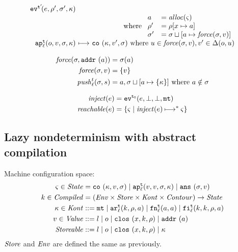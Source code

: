 \documentclass{llncs}
\newcommand{\alt}{\mid}
\begin{document}
\begin{gather*}
\begin{array}{@{}r@{\ }c@{\ }l@{}}
\ev[^{\mcntr'}\!]{\mexp,\menv',\msto',\mkont}
\\
\multicolumn{3}{r@{}}{
\text{ where }
\begin{array}{ll}
 \maddr &= \alloc(\mstate) \\
 \menv' &= \menv[\mvar \mapsto \maddr] \\
 \msto' &= \msto\sqcup[\maddr \mapsto \spchoice{\force(\msto, \mval)}{\force(\mval)}]
\end{array}}
\\
\ap[^\mcntr_\mlab]{\mop,\mval,\msto,\mkont} & \machstep&
\co{\mkont,\mval',\msto}
\text{ where } \mvalx{u} \in \spchoice{\force(\msto, \mval)}{\force(\mval)}, \mval'\in\interpdelta(\mop,\mvalx{u})
\end{array}
\end{gather*}

\begin{align*}
\spchoice
{\force(\msto,\saddr\maddr) &= \msto(\maddr) \\
 \force(\msto,\mval) &= \{ \mval \}}
{\force(\superposition{\mval{s}}) &= \mval{s} \\
 \force(\mval) &= \{ \mval \}}
\\
\push_\mlab^\mcntr(\msto,\mstor) &= \maddr,\msto\sqcup[\maddr\mapsto\{\mkont\}]
\mbox{ where }\maddr \notin\msto
\end{align*}

\begin{align*}
\inject(\mexp) &= \ev[^\mtcntr]{\mexp,\bot,\bot,\kmt} \\
\reachable{\mexp} &= \setof{\mstate \mid \inject(\mexp) \machstep^* \mstate}
\end{align*}

\subsection{Lazy nondeterminism with abstract compilation}

Machine configuration space:
\begin{align*}
\mstate \in \State &= \co{\mkont, \mval, \msto} \alt
                     \ap[_\mlab^\mcntr]{\mval,\mval,\msto,\mkont} \alt
                     \ans{\msto, \mval}\\
\mcomp \in \Compiled &= (\Env \times \Store \times \Kont \times \Counter) \to \State \\
\mkont \in \Kont &::= \kmt \alt
                      \kar[_\mlab^\mcntr]{\mcomp, \menv, \maddr} \alt
                      \kfn[_\mlab^\mcntr]{\maddr, \maddr} \alt
                      \kif[_\mlab^\mcntr]{\mcomp, \mcomp, \menv, \maddr} \\
\mval \in \Value &::= \mlit \alt \mop \alt
                      \clos{\mvar,\mcomp,\menv} \alt
                      \spchoice{\saddr\maddr}{\superposition{\mval{s}}}
\spchoice{\\}{\\\mval{s} \in \wp(\Value)\\}
\Storeable &::= \mlit \alt \mop \alt
                \clos{\mvar,\mcomp,\menv} \alt
                \mkont \\
\end{align*}
$\Store$ and $\Env$ are defined the same as previously.
\end{document}
